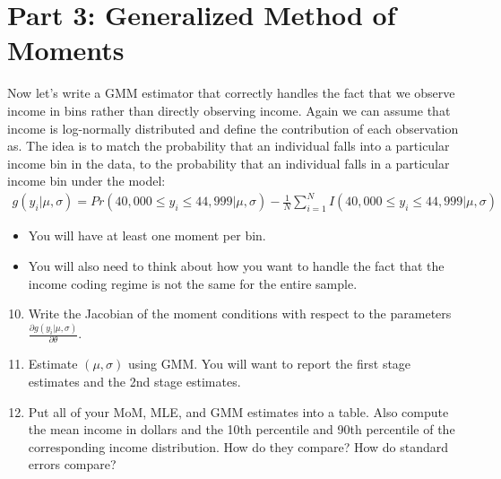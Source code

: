 \documentclass{article}
\begin{document}
\section*{\normalsize Part 3: Generalized Method of Moments}
Now let's write a GMM estimator that correctly handles the fact that we observe income in bins rather than directly observing income. Again we can assume that income is log-normally distributed and define the contribution of each observation as. The idea is to match the probability that an individual falls into a particular income bin in the data, to the probability that an individual falls in a particular income bin under the model:
\begin{align*}
g(y_i | \mu,\sigma) = Pr(40,000 \leq y_i \leq 44,999 | \mu,\sigma) -  \frac{1}{N}\sum_{i=1}^N I(40,000 \leq y_i \leq 44,999 | \mu,\sigma) 
\end{align*} 
\begin{itemize}
\item You will have at least one moment per bin.
\item You will also need to think about how you want to handle the fact that the income coding regime is not the same for the entire sample.
\end{itemize}
\begin{enumerate}
\setcounter{enumi}{9}
\item Write the Jacobian of the moment conditions with respect to the parameters $\frac{\partial g(y_i | \mu,\sigma)}{\partial \theta}$.
\item Estimate $(\mu,\sigma)$ using GMM. You will want to report the first stage estimates and the 2nd stage estimates.
\item Put all of your MoM, MLE, and GMM estimates into a table. Also compute the mean income in dollars and the 10th percentile and 90th percentile of the corresponding income distribution. How do they compare? How do standard errors compare?
\end{enumerate}
\end{document}
